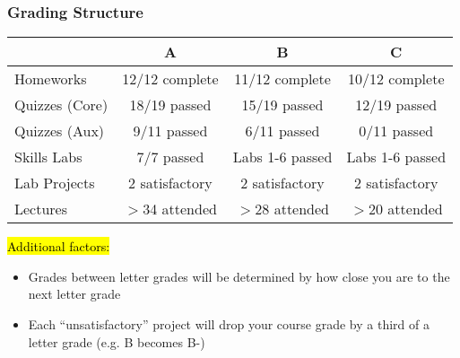 \documentclass[slidestop,compress,mathserif]{beamer}
\begin{document}
\begin{frame}
	\frametitle{Grading Structure}
	\begin{table}[ht]
	\centering
	\small
	\begin{tabular}{|l|c|c|c|}
	\hline
	 & \textbf{A} & \textbf{B} & \textbf{C} \\
	\hline
	Homeworks & 12/12 complete & 11/12 complete & 10/12 complete \\
	\hline
	Quizzes (Core) & 18/19 passed & 15/19 passed & 12/19 passed \\
	\hline
	Quizzes (Aux) & 9/11 passed & 6/11 passed & 0/11 passed \\
	\hline
	Skills Labs & 7/7 passed & Labs 1-6 passed & Labs 1-6 passed \\
	\hline
	Lab Projects & 2 satisfactory & 2 satisfactory & 2 satisfactory \\
	\hline
	Lectures & $>$34 attended & $>$28 attended & $>$20 attended \\
	\hline
	\end{tabular}
	\end{table}

	\hl{Additional factors:}
	\begin{itemize}
		\item Grades between letter grades will be determined by how close you are to the next letter grade
		\item Each ``unsatisfactory'' project will drop your course grade by a third of a letter grade (e.g. B becomes B-)
	\end{itemize}
\end{frame}

\end{document}
